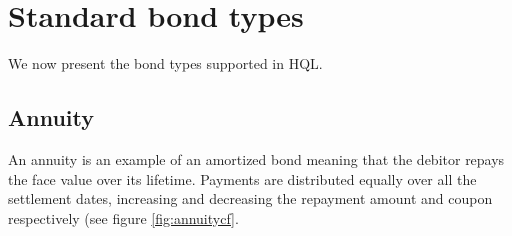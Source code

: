 \documentclass[11pt,a4paper]{article}
\numberwithin{equation}{section}
\begin{document}
	\section{Standard bond types}

	We now present the bond types supported in HQL.



	\subsection{Annuity}

	An annuity is an example of an amortized bond meaning that the debitor repays the
	face value over its lifetime. Payments are distributed equally over all the settlement
	dates, increasing and decreasing the repayment amount and coupon respectively (see figure
	\ref{fig:annuitycf}.
\end{document}
